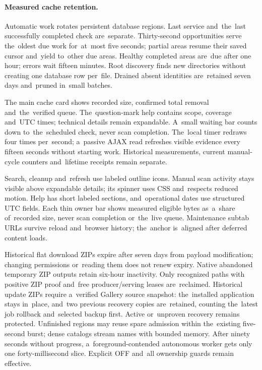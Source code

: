 \documentclass[11pt,a4paper]{article}
\begin{document}
\paragraph{Measured cache retention.}
Automatic work rotates persistent database regions. Last service and~the~last
successfully completed check are~separate. Thirty-second opportunities serve
the~oldest due work for~at~most five seconds; partial areas resume their saved
cursor and~yield to~other due areas. Healthy completed areas are~due after one
hour; errors wait fifteen minutes. Root discovery finds new directories without
creating one database row per~file. Drained absent identities are~retained seven
days and~pruned in~small batches.

The main cache card shows recorded size, confirmed total removal
and~the~verified queue. The~question-mark help contains scope, coverage and~UTC
times; technical details remain expandable. A~small waiting bar counts down
to~the~scheduled check, never scan completion. The~local timer redraws four
times per~second; a~passive AJAX read refreshes visible evidence every fifteen
seconds without starting work. Historical measurements, current manual-cycle
counters and~lifetime receipts remain separate.

Search, cleanup and~refresh use labeled outline icons. Manual scan activity
stays visible above expandable details; its spinner uses CSS and~respects
reduced motion. Help has short labeled sections, and~operational dates use
structured UTC fields. Each thin owner bar shows measured eligible bytes
as~a~share of~recorded size, never scan completion or~the~live queue.
Maintenance subtab URLs survive reload and~browser history; the~anchor
is~aligned after deferred content loads.

Historical flat download ZIPs expire after seven days from payload modification;
changing permissions or~reading them does not renew expiry. Native abandoned
temporary ZIP outputs retain six-hour inactivity. Only recognized paths with
positive ZIP proof and~free producer/serving leases are~reclaimed. Historical
update ZIPs require a~verified Gallery source snapshot: the~installed
application stays in~place, and~two previous recovery copies are~retained,
counting the~latest job rollback and~selected backup first. Active or~unproven
recovery remains protected. Unfinished regions may reuse spare admission within
the~existing five-second burst; dense catalogs stream names with bounded memory.
After ninety seconds without progress, a~foreground-contended autonomous worker
gets only one forty-millisecond slice. Explicit OFF and~all ownership guards
remain effective.
\end{document}
